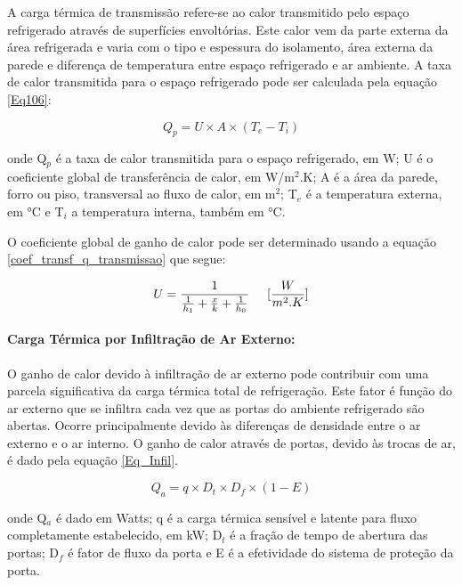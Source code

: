 \documentclass[10pt,a4paper]{article}
\begin{document}
A carga térmica de transmissão refere-se ao calor transmitido pelo espaço refrigerado através de superfícies envoltórias. Este calor vem da parte externa da área refrigerada e varia com o tipo e espessura do isolamento, área externa da parede e diferença de temperatura entre espaço refrigerado e ar ambiente. A taxa de calor transmitida para o espaço refrigerado pode ser calculada pela equação \ref{Eq106}:

\begin{equation}
    Q_p = U \times A \times (T_e - T_i)
    \label{Eq106}
\end{equation}

onde Q$_p$ é a taxa de calor transmitida para o espaço refrigerado, em W; U é o coeficiente global de transferência de calor, em W/m$^{2}$.K; A é a área da parede, forro ou
piso, transversal ao fluxo de calor, em m$^{2}$; T$_e$ é a temperatura externa, em °C e T$_i$ a temperatura
interna, também em °C.

O coeficiente global de ganho de calor pode ser determinado usando a equação \ref{coef_transf_q_transmissao} que segue:

\begin{equation}\label{coef_transf_q_transmissao}
    U = \frac{1}{\frac{1}{h_1} + \frac{x}{k} + \frac{1}{h_0}} \hspace{0.5cm} [\frac{W}{m^2.K}]
\end{equation}


\paragraph*{{ Carga Térmica por Infiltração de Ar Externo:}}

O ganho de calor devido à infiltração de ar externo pode contribuir com uma parcela significativa da carga térmica total de refrigeração. Este fator é função do ar externo que se infiltra cada vez que as portas do ambiente refrigerado são abertas. Ocorre principalmente devido às diferenças de densidade entre o ar externo e o ar interno. O ganho de calor através de portas, devido às trocas de ar, é dado pela equação \ref{Eq_Infil}.

\begin{equation}
    Q_a = q \times D_t \times D_f \times (1-E)
    \label{Eq_Infil}
\end{equation}

onde Q$_a$ é dado em Watts; q é a carga térmica sensível e latente para fluxo completamente estabelecido, em kW; D$_t$ é a fração de tempo de abertura das portas; D$_f$ é fator de fluxo da porta e E é a efetividade do sistema de proteção da porta.
\end{document}
